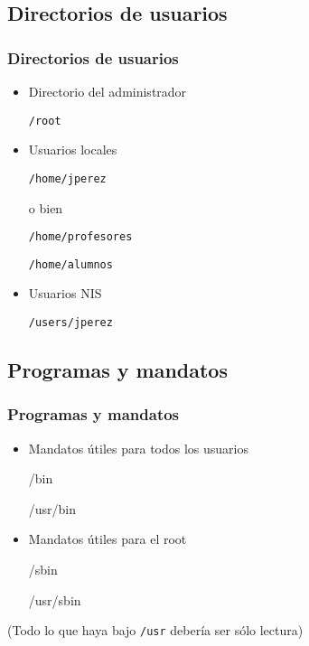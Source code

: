 \documentclass[ucs]{beamer}
\begin{document}
\subsection{Directorios de usuarios}


\begin{frame}[fragile]
\frametitle{Directorios de usuarios}
\begin{itemize}

\item 

Directorio del administrador

\verb|/root|

\item 

Usuarios locales

\verb|/home/jperez|

o bien

\verb|/home/profesores|

\verb|/home/alumnos|
\item 
Usuarios NIS

\verb|/users/jperez|

\end{itemize}
\end{frame}







\subsection{Programas y mandatos} 

\begin{frame}[fragile]

\frametitle{Programas y mandatos} 
\begin{itemize}

\item 
Mandatos útiles para todos los usuarios

/bin

/usr/bin

\item
Mandatos útiles para el root

/sbin

/usr/sbin

\end{itemize}
(Todo lo que haya bajo \verb|/usr| debería ser sólo lectura)
\end{frame}
\end{document}
